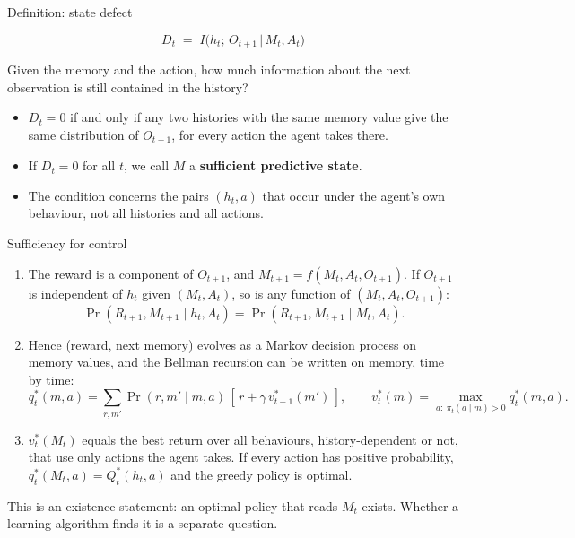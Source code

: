 \documentclass[11pt,aspectratio=169]{beamer}
\begin{document}
\begin{frame}{Definition: state defect}
\begin{block}{}
\[
D_t \;=\; I\big(h_t;\, O_{t+1} \,\big|\, M_t, A_t\big)
\]
\end{block}
\vspace{1mm}
Given the memory and the action, how much information about the next observation is still contained in the history?
\vspace{3mm}
\begin{itemize}
\item $D_t = 0$ if and only if any two histories with the same memory value give the same distribution of $O_{t+1}$, for every action the agent takes there.
\item If $D_t = 0$ for all $t$, we call $M$ a \textbf{sufficient predictive state}.
\item The condition concerns the pairs $(h_t, a)$ that occur under the agent's own behaviour, not all histories and all actions.
\end{itemize}
\end{frame}

\begin{frame}{Sufficiency for control}
\begin{enumerate}
\item The reward is a component of $O_{t+1}$, and $M_{t+1} = f(M_t, A_t, O_{t+1})$. If $O_{t+1}$ is independent of $h_t$ given $(M_t, A_t)$, so is any function of $(M_t, A_t, O_{t+1})$:
  \[
  \Pr(R_{t+1}, M_{t+1} \mid h_t, A_t) = \Pr(R_{t+1}, M_{t+1} \mid M_t, A_t) .
  \]
\item Hence (reward, next memory) evolves as a Markov decision process on memory values, and the Bellman recursion can be written on memory, time by time:
  \[
  q^*_t(m, a) = \sum_{r, m'} \Pr(r, m' \mid m, a)\,[\,r + \gamma\, v^*_{t+1}(m')\,], \qquad v^*_t(m) = \max_{a:\ \pi_t(a \mid m) > 0} q^*_t(m, a).
  \]
\item $v^*_t(M_t)$ equals the best return over all behaviours, history-dependent or not, that use only actions the agent takes. If every action has positive probability, $q^*_t(M_t, a) = Q^*_t(h_t, a)$ and the greedy policy is optimal.
\end{enumerate}
\vspace{2mm}
This is an existence statement: an optimal policy that reads $M_t$ exists. Whether a learning algorithm finds it is a separate question.
\end{frame}
\end{document}
